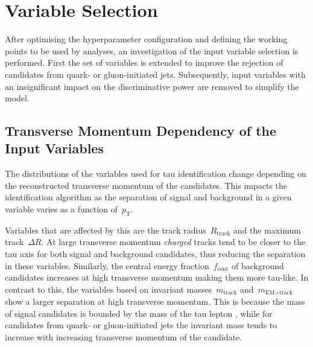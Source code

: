 \section{Variable Selection}
\label{sec:bdt_variable_selection}

After optimising the hyperparameter configuration and defining the working
points to be used by analyses, an investigation of the input variable selection
is performed. First the set of variables is extended to improve the rejection of
\tauhadvis candidates from quark- or gluon-initiated jets. Subsequently, input
variables with an insignificant impact on the discriminative power are removed
to simplify the model.

\subsection{Transverse Momentum Dependency of the Input Variables}
\label{sec:bdt_incl_pt}


The distributions of the variables used for tau identification change depending
on the reconstructed transverse momentum of the \tauhadvis candidates. This
impacts the identification algorithm as the separation of signal and background
in a given variable varies as a function of~$p_\text{T}$.

Variables that are affected by this are the track radius~$R_\text{track}$ and
the maximum track~$\Delta R$. At large transverse momentum \emph{charged} tracks
tend to be closer to the tau axis for both signal and background candidates,
thus reducing the separation in these variables. Similarly, the central energy
fraction~$f_\text{cent}$ of background candidates increases at high transverse
momentum making them more tau-like. In contrast to this, the variables based on
invariant masses~$m_\text{track}$ and~$m_\text{EM+track}$ show a larger
separation at high transverse momentum. This is because the mass of signal
candidates is bounded by the mass of the tau lepton , while for candidates from
quark- or gluon-initiated jets the invariant mass tends to increase with
increasing transverse momentum of the \tauhadvis candidate. 

